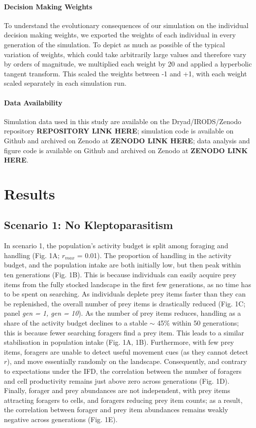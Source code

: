 \documentclass[11pt]{article}
\begin{document}
\paragraph{Decision Making Weights}

To understand the evolutionary consequences of our simulation on the individual decision making weights, we exported the weights of each individual in every generation of the simulation.
To depict as much as possible of the typical variation of weights, which could take arbitrarily large values and therefore vary by orders of magnitude, we multiplied each weight by 20 and applied a hyperbolic tangent transform.
This scaled the weights between -1 and +1, with each weight scaled separately in each simulation run.

\paragraph*{Data Availability}

Simulation data used in this study are available on the Dryad/IRODS/Zenodo repository \textbf{REPOSITORY LINK HERE}; 
simulation code is available on Github and archived on Zenodo at \textbf{ZENODO LINK HERE}; 
data analysis and figure code is available on Github and archived on Zenodo at \textbf{ZENODO LINK HERE}.

\section{Results}

\subsection{Scenario 1: No Kleptoparasitism}

In scenario 1, the population's activity budget is split among foraging and handling (Fig. 1A; $r_{max}$ = 0.01).
The proportion of handling in the activity budget, and the population intake are both initially low, but then peak within ten generations (Fig. 1B).
This is because individuals can easily acquire prey items from the fully stocked landscape in the first few generations, as no time has to be spent on searching.
As individuals deplete prey items faster than they can be replenished, the overall number of prey items is drastically reduced (Fig. 1C; panel \textit{gen = 1, gen = 10}).
As the number of prey items reduces, handling as a share of the activity budget declines to a stable $\sim$ 45\% within 50 generations; this is because fewer searching foragers find a prey item.
This leads to a similar stabilisation in population intake (Fig. 1A, 1B).
Furthermore, with few prey items, foragers are unable to detect useful movement cues (as they cannot detect $r$), and move essentially randomly on the landscape.
Consequently, and contrary to expectations under the IFD, the correlation between the number of foragers and cell productivity remains just above zero across generations (Fig. 1D).
Finally, forager and prey abundances are not independent, with prey items attracting foragers to cells, and foragers reducing prey item counts; as a result, the correlation between forager and prey item abundances remains weakly negative across generations (Fig. 1E).
\end{document}
